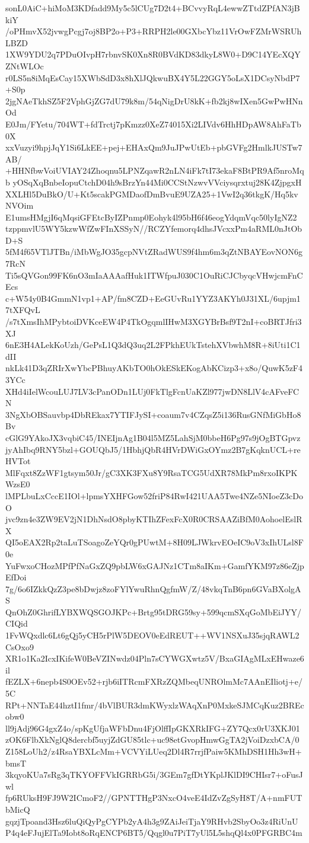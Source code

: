 sonL0AiC+hiMoM3KDfadd9My5c5lCUg7D2t4+BCvvyRqL4ewwZTtdZPfAN3jBkiY
/oPHmvX52jvwgPcgj7oj8BP2o+P3+RRPH2le00GXbcYbz11VrOwFZMrWSRUhLBZD
1XW9YDU2q7PDuOIvpH7rbnvSK0Xn8R0BVdKD83dkyL8W0+D9C14YEcXQYZNtWLOc
r0LS5n8iMqEsCay15XWbSdD3x8hXlJQkwuBX4Y5L22GGY5oLsX1DCsyNbdP7+S0p
2jgNAeTkhSZ5F2VphGjZG7dU79k8m/54qNigDrU8kK+fb2kj8wIXen5GwPwHNnOd
E0Jm/FYetu/704WT+fdTrctj7pKmzz0XeZ74015Xi2LIVdv6HhHDpAW8AhFaTb0X
xxVuzyi9hpjJqY1Si6LkEE+pej+EHAxQm9JuJPwUtEb+pbGVFg2HmlkJUSTw7AB/
+HHNfbwVoiUVIAY24Zhoqnu5LPNZqawR2nLN4iFk7tI73ekaF8BtPR9Af5nroMqb
yOSqXqBnbeIopuCtchD04h9sBrzYn44Mi0CCStNzwvVVciysqrxtuj28K4ZjpgxH
XXLHl5DuBkO/U+Kt5scakPGMDaofDmBvuE9UZA25+1VwI2q36tkgK/Hq5kvNVOim
E1umsHMgjI6qMqsiGFEtcByIZPnmp0Eohyk4l95bH6f46eogYdqmVqc50lyIgNZ2
tzppmvlU5WY5kzwWfZwFInXSSyN//RCZYfemorq4dhsJVcxxPm4aRML0nJtObD+S
5fM4f65VTlJTBn/iMbWgJO35gcpNVtZRadWUS9f4hm6m3qZtNBAYEovNON6g7RcN
Ti5sQVGon99FK6nO3mIaAAAafHuk1ITWfpuJ030C1OuRiCJCbyqcVHwjcmFnCEcs
c+W54y0B4GmmN1vp1+AP/fm8CZD+EeGUvRu1YYZ3AKYh0J31XL/6upjm17tXFQvL
/s7tXmsIhMPybtoiDVKceEW4P4TkOgqmlIHwM3XGYBrBsf9T2nI+coBRTJfri3XJ
6nE3H4ALekKoUzh/GePsL1Q3dQ3uq2L2FPkhEUkTstehXVbwhM8R+8iUti1C1dII
nkLk41D3qZRIrXwYbcPBhuyAKbTO0hOkESkEKogAbKCizp3+x8o/QuwK5zF43YCc
XHd4iIelWcouLUJ7LV3cPanODn1LUj0FkTlgFcnUaKZl977jwDN8LlV4cAFveFCN
3NgXbOBSauvbp4DbREkax7YTIFJySI+coaum7v4CZqsZ5i136RusGNfMiGbHo8Bv
cGlG9YAkoJX3vqbiC45/INEIjnAg1B04l5MZ5LahSjM0bbeH6Pg97s9jOgBTGpvz
jyAhIbq9RNY5bzl+GOUQbJ5/1HbhjQbR4HVrDWiGxOYmz2B7gKqknUCL+reHVTot
MlFqxt8ZzWF1gtsym50Jr/gC3XK3FXu8Y9RsaTCG5UdXR78MkPm8rxoIKPKWzsE0
lMPLbuLxCccE1IOl+lpmsYXHFGow52friP84RwI421UAA5Twe4NZe5NIoeZ3cDoO
jvc9zn4e3ZW9EV2jN1DhNsdO8pbyKTIhZFexFcX0R0CRSAAZiBfM0AohoelEslRX
QI5oEAX2Rp2taLuTSoagoZeYQr0gPUwtM+8H09LJWkrvEOeIC9oV3xIhULsl8F0e
YuFwxoCHozMPfPfNaGxZQ9pbLW6xGAJNz1CTm8aIKm+GamfYKM97z86eZjpEfDoi
7g/6o6IZkkQzZ3pe8bDwjz8zoFYlYwuRhnQgfmW/Z/48vkqTnB6pn6GVaBXolgAS
QnOhZ0GhrifLYBXWQSGOJKPc+Brtg95tDRG59sy+599qcmSXqGoMbEiJYY/CIQid
1FvWQxdlc6Lt6gQj5yCH5rPlW5DEOV0eEdREUT++WV1NSXuJ35sjqRAWL2CsOxo9
XR1o1Ka2IcxIKifeW0BeVZINwdz04Pln7sCYWGXwtz5V/BxaGIAgMLxEHwaze6il
fEZLX+6nepb4S0OEv52+rjb6iITRcmFXRzZQMbeqUNROlmMc7AAnEIliotj+e/5C
RPt+NNTaE44hztI1fmr/4bVlBUR3dmKWyxlzWAqXnP0MxkeSJMCqKuz2BREcobw0
ll9jAdj96G4gxZ4o/spKgUfjaWFbDnu4FjOlffIpGKXRkIFG+ZY7Qcx0rU3XKJ01
zOK6FlbXkNglQ8dercbf5uyjZdGU85tlc+uc98etGvopHmwGgTA2jVoiDzxbCA/0
Z158LoUh2/z4RsaYBXLcMm+VCVYiLUeq2Dl4R7rrjfPaiw5KMhDSH1Hh3wH+bmsT
3kqyoKUa7sRg3qTKYOFFVkIGRRbG5i/3GEm7gfDtYKplJKlDI9CHIsr7+oFusJwl
fp6RUksH9FJ9W2ICmoF2//GPNTTHgP3NxcO4veE4IdZvZgSyH8T/A+nmFUTbMicQ
gqzjTpoand3Hsz6luQiQyPgCYPb2yA4h3g9ZAiJeiTjaY9RHvb2SbyOo3z4RiUnU
P4q4eFJujElTa9Iobt8oRqENCP6BT5/Qqgl0u7PiT7yUl5L5shqQl4x0PFGRBC4m
